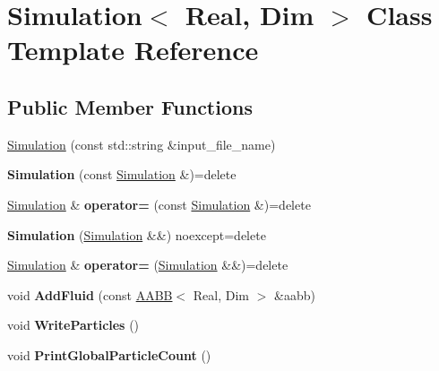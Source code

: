 \hypertarget{classSimulation}{}\section{Simulation$<$ Real, Dim $>$ Class Template Reference}
\label{classSimulation}
\subsection*{Public Member Functions}
\begin{DoxyCompactItemize}
\item 
\hyperlink{classSimulation_a637ac795ed1dfc434861fad805a8c629}{Simulation} (const std\+::string \&input\+\_\+file\+\_\+name)
\item 
\hypertarget{classSimulation_a057d6d2415c381cd940d8191b5c915aa}{}{\bfseries Simulation} (const \hyperlink{classSimulation}{Simulation} \&)=delete\label{classSimulation_a057d6d2415c381cd940d8191b5c915aa}

\item 
\hypertarget{classSimulation_afa8a81fcbd2d52cda47fd241e11597c8}{}\hyperlink{classSimulation}{Simulation} \& {\bfseries operator=} (const \hyperlink{classSimulation}{Simulation} \&)=delete\label{classSimulation_afa8a81fcbd2d52cda47fd241e11597c8}

\item 
\hypertarget{classSimulation_aa5166aa19025b4be9fca0d449f6adeaf}{}{\bfseries Simulation} (\hyperlink{classSimulation}{Simulation} \&\&) noexcept=delete\label{classSimulation_aa5166aa19025b4be9fca0d449f6adeaf}

\item 
\hypertarget{classSimulation_ace1a6fc86140c18f3caffdae80262b7f}{}\hyperlink{classSimulation}{Simulation} \& {\bfseries operator=} (\hyperlink{classSimulation}{Simulation} \&\&)=delete\label{classSimulation_ace1a6fc86140c18f3caffdae80262b7f}

\item 
\hypertarget{classSimulation_a0c6f5a5ba668f22dc287247e3d896183}{}void {\bfseries Add\+Fluid} (const \hyperlink{classAABB}{A\+A\+B\+B}$<$ Real, Dim $>$ \&aabb)\label{classSimulation_a0c6f5a5ba668f22dc287247e3d896183}

\item 
\hypertarget{classSimulation_a753facc360a03ac34e2be3c0ab7fdfd4}{}void {\bfseries Write\+Particles} ()\label{classSimulation_a753facc360a03ac34e2be3c0ab7fdfd4}

\item 
\hypertarget{classSimulation_a27e2e87b13df5a456c86bd79b97883a4}{}void {\bfseries Print\+Global\+Particle\+Count} ()\label{classSimulation_a27e2e87b13df5a456c86bd79b97883a4}


\end{DoxyCompactItemize}
